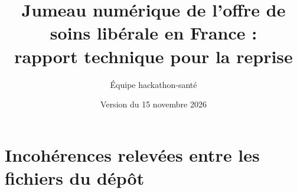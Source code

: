 \documentclass[11pt]{article}
\title{Jumeau numérique de l'offre de soins libérale en France :\\
rapport technique pour la reprise}
\author[1]{Équipe hackathon-santé}
\affil[1]{Dépôt \texttt{progdinh/hackathon\_acces\_soins}, dossier \texttt{v2/}}
\date{Version du 15 novembre 2026}
\begin{document}
\maketitle

\tableofcontents
\clearpage














\clearpage



\appendix
\section{Incohérences relevées entre les fichiers du dépôt}\label{ann:incoherences}






\end{document}
